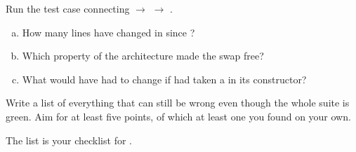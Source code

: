 \label{ex:11:4}
Run the test case connecting  $\rightarrow$  $\rightarrow$
.
\begin{enumerate}[a)]
  \item How many lines have changed in  since ?
  \item Which property of the architecture made the swap free?
  \item What would have had to change if  had taken a  in
    its constructor?
\end{enumerate}

\label{ex:11:5}
Write a list of everything that can still be wrong even though the whole suite is green. Aim for
at least five points, of which at least one you found on your own.

The list is your checklist for .
